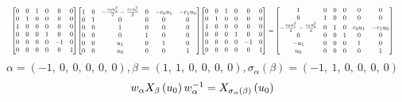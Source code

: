 \documentclass[11pt]{article}
\theoremstyle{definition}
\begin{document}
\[
\scaletoalign{\textwidth}{{\left[\begin{matrix}0 & 0 & 1 & 0 & 0 & 0\\0 & 1 & 0 & 0 & 0 & 0\\1 & 0 & 0 & 0 & 0 & 0\\0 & 0 & 0 & 1 & 0 & 0\\0 & 0 & 0 & 0 & -1 & 0\\0 & 0 & 0 & 0 & 0 & 1\end{matrix}\right]} {\left[\begin{matrix}1 & 0 & - \frac{c_{0} u_{1}^{2}}{2} - \frac{c_{1} u_{0}^{2}}{2} & 0 & - c_{0} u_{1} & - c_{1} u_{0}\\0 & 1 & 0 & 0 & 0 & 0\\0 & 0 & 1 & 0 & 0 & 0\\0 & 0 & 0 & 1 & 0 & 0\\0 & 0 & u_{1} & 0 & 1 & 0\\0 & 0 & u_{0} & 0 & 0 & 1\end{matrix}\right]} {\left[\begin{matrix}0 & 0 & 1 & 0 & 0 & 0\\0 & 1 & 0 & 0 & 0 & 0\\1 & 0 & 0 & 0 & 0 & 0\\0 & 0 & 0 & 1 & 0 & 0\\0 & 0 & 0 & 0 & -1 & 0\\0 & 0 & 0 & 0 & 0 & 1\end{matrix}\right]} = {\left[\begin{matrix}1 & 0 & 0 & 0 & 0 & 0\\0 & 1 & 0 & 0 & 0 & 0\\- \frac{c_{0} u_{1}^{2}}{2} - \frac{c_{1} u_{0}^{2}}{2} & 0 & 1 & 0 & c_{0} u_{1} & - c_{1} u_{0}\\0 & 0 & 0 & 1 & 0 & 0\\- u_{1} & 0 & 0 & 0 & 1 & 0\\u_{0} & 0 & 0 & 0 & 0 & 1\end{matrix}\right]}}
\]
\[
\alpha = \left( -1, \  0, \  0, \  0, \  0, \  0\right), \beta = \left( 1, \  1, \  0, \  0, \  0, \  0\right), \sigma_{\alpha}(\beta) = \left( -1, \  1, \  0, \  0, \  0, \  0\right)
\]
\[
\scaletoalign{\textwidth}{w_{\alpha} X_{\beta}\left(u_{0}\right) w_{\alpha}^{-1} = X_{\sigma_{\alpha}\left(\beta\right)}\left(u_{0}\right)}
\]
\end{document}
